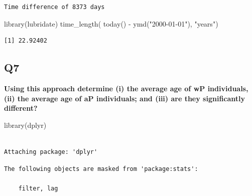 \documentclass[
  letterpaper,
  DIV=11,
  numbers=noendperiod]{scrartcl}
\newenvironment{Shaded}{\begin{snugshade}}{\end{snugshade}}
\newcommand{\FunctionTok}[1]{\textcolor[rgb]{0.28,0.35,0.67}{#1}}
\newcommand{\NormalTok}[1]{\textcolor[rgb]{0.00,0.23,0.31}{#1}}
\newcommand{\OtherTok}[1]{\textcolor[rgb]{0.00,0.23,0.31}{#1}}
\newcommand{\SpecialCharTok}[1]{\textcolor[rgb]{0.37,0.37,0.37}{#1}}
\newcommand{\StringTok}[1]{\textcolor[rgb]{0.13,0.47,0.30}{#1}}
\begin{document}
\begin{verbatim}
Time difference of 8373 days
\end{verbatim}

\begin{Shaded}
\begin{Highlighting}[]
\FunctionTok{library}\NormalTok{(lubridate)}
\FunctionTok{time\_length}\NormalTok{( }\FunctionTok{today}\NormalTok{() }\SpecialCharTok{{-}} \FunctionTok{ymd}\NormalTok{(}\StringTok{"2000{-}01{-}01"}\NormalTok{),  }\StringTok{"years"}\NormalTok{)}
\end{Highlighting}
\end{Shaded}

\begin{verbatim}
[1] 22.92402
\end{verbatim}

\hypertarget{q7}{%
\subsection{Q7}\label{q7}}

\textbf{Using this approach determine (i) the average age of wP
individuals, (ii) the average age of aP individuals; and (iii) are they
significantly different?}

\begin{Shaded}
\end{Shaded}

\begin{Shaded}
\begin{Highlighting}[]
\FunctionTok{library}\NormalTok{(dplyr)}
\end{Highlighting}
\end{Shaded}

\begin{verbatim}

Attaching package: 'dplyr'
\end{verbatim}

\begin{verbatim}
The following objects are masked from 'package:stats':

    filter, lag
\end{verbatim}
\end{document}

